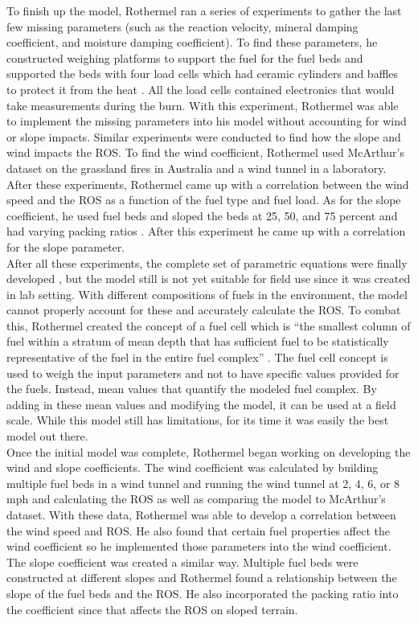 \documentclass{article}
\begin{document}
\indent To finish up the model, Rothermel ran a series of experiments to gather the last few missing parameters (such as the reaction velocity, mineral damping coefficient, and moisture damping coefficient). To find these parameters, he constructed weighing platforms to support the fuel for the fuel beds and supported the beds with four load cells which had ceramic cylinders and baffles to protect it from the heat \citep{Rothermel1972}. All the load cells contained electronics that would take measurements during the burn. With this experiment, Rothermel was able to implement the missing parameters into his model without accounting for wind or slope impacts. Similar experiments were conducted to find how the slope and wind impacts the ROS. To find the wind coefficient, Rothermel used McArthur’s dataset on the grassland fires in Australia and a wind tunnel in a laboratory. After these experiments, Rothermel came up with a correlation between the wind speed and the ROS as a function of the fuel type and fuel load. As for the slope coefficient, he used fuel beds and sloped the beds at 25, 50, and 75 percent and had varying packing ratios \citep{Rothermel1972}. After this experiment he came up with a correlation for the slope parameter. \\
\indent After all these experiments, the complete set of parametric equations were finally developed \citep{Rothermel1972}, but the model still is not yet suitable for field use since it was created in lab setting. With different compositions of fuels in the environment, the model cannot properly account for these and accurately calculate the ROS. To combat this, Rothermel created the concept of a fuel cell which is “the smallest column of fuel within a stratum of mean depth that has sufficient fuel to be statistically representative of the fuel in the entire fuel complex” \citep{Rothermel1972}. The fuel cell concept is used to weigh the input parameters and not to have specific values provided for the fuels. Instead, mean values that quantify the modeled fuel complex. By adding in these mean values and modifying the model, it can be used at a field scale. While this model still has limitations, for its time it was easily the best model out there. \\ 
\indent Once the initial model was complete, Rothermel began working on developing the wind and slope coefficients. The wind coefficient was calculated by building multiple fuel beds in a wind tunnel and running the wind tunnel at 2, 4, 6, or 8 mph and calculating the ROS as well as comparing the model to McArthur's dataset. With these data, Rothermel was able to develop a correlation between the wind speed and ROS. He also found that certain fuel properties affect the wind coefficient so he implemented those parameters into the wind coefficient. The slope coefficient was created a similar way. Multiple fuel beds were constructed at different slopes and Rothermel found a relationship between the slope of the fuel beds and the ROS. He also incorporated the packing ratio into the coefficient since that affects the ROS on sloped terrain. 
\end{document}
